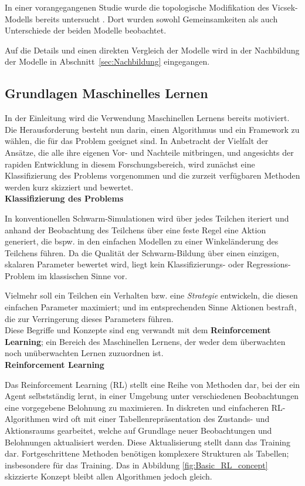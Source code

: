 \documentclass{solutionclass}
\begin{document}
In einer vorangegangenen Studie wurde die topologische Modifikation des Vicsek-Modells bereits untersucht \cite{PhaseTransitions2013}. Dort wurden sowohl Gemeinsamkeiten als auch Unterschiede der beiden Modelle beobachtet.

Auf die Details und einen direkten Vergleich der Modelle wird in der Nachbildung der Modelle in Abschnitt~\ref{sec:Nachbildung} eingegangen.

\subsection{Grundlagen Maschinelles Lernen}
In der Einleitung wird die Verwendung Maschinellen Lernens bereits motiviert. Die Herausforderung besteht nun darin, einen Algorithmus und ein Framework zu wählen, die für das Problem geeignet sind. In Anbetracht der Vielfalt der Ansätze, die alle ihre eigenen Vor- und Nachteile mitbringen, und angesichts der rapiden Entwicklung in diesem Forschungsbereich, wird zunächst eine Klassifizierung des Problems vorgenommen und die zurzeit verfügbaren Methoden werden kurz skizziert und bewertet.\\

\textbf{Klassifizierung des Problems}

In konventionellen Schwarm-Simulationen wird über jedes Teilchen iteriert und anhand der Beobachtung des Teilchens über eine feste Regel eine Aktion generiert, die bspw. in den einfachen Modellen zu einer Winkeländerung des Teilchens führen. Da die Qualität der Schwarm-Bildung über einen einzigen, skalaren Parameter bewertet wird, liegt kein Klassifizierungs- oder Regressions-Problem im klassischen Sinne vor.

Vielmehr soll ein Teilchen ein Verhalten bzw. eine \textit{Strategie} entwickeln, die diesen einfachen Parameter maximiert; und im entsprechenden Sinne Aktionen bestraft, die zur Verringerung dieses Parameters führen.\\

Diese Begriffe und Konzepte sind eng verwandt mit dem \textbf{Reinforcement Learning}; ein Bereich des Maschinellen Lernens, der weder dem überwachten noch unüberwachten Lernen zuzuordnen ist. \\

\textbf{Reinforcement Learning}

Das Reinforcement Learning (RL) stellt eine Reihe von Methoden dar, bei der ein Agent selbstständig lernt, in einer Umgebung unter verschiedenen Beobachtungen eine vorgegebene Belohnung zu maximieren. In diskreten und einfacheren RL-Algorithmen wird oft mit einer Tabellenrepräsentation des Zustands- und Aktionsraums gearbeitet, welche auf Grundlage neuer Beobachtungen und Belohnungen aktualisiert werden. Diese Aktualisierung stellt dann das Training dar. Fortgeschrittene Methoden benötigen komplexere Strukturen als Tabellen; insbesondere für das Training. Das in Abbildung \ref{fig:Basic_RL_concept} skizzierte Konzept bleibt allen Algorithmen jedoch gleich.
\end{document}
